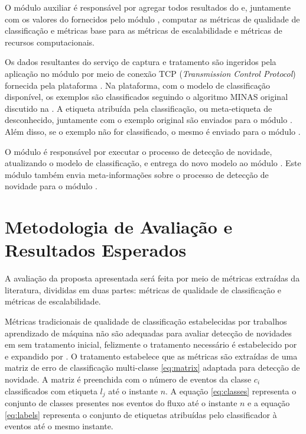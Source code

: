 O módulo auxiliar \sink é responsável por agregar todos resultados do \mfog e,
juntamente com os valores do \dataset fornecidos pelo módulo \source, computar
as métricas de qualidade de classificação e métricas base para as métricas de
escalabilidade e métricas de recursos computacionais.

Os dados resultantes do serviço de captura e tratamento são ingeridos pela
aplicação no módulo \classify por meio de conexão TCP (\emph{Transmission
Control Protocol}) fornecida pela plataforma \flink.
Na plataforma, com o modelo de classificação disponível, os exemplos são
classificados seguindo o algoritmo MINAS original discutido na .
A etiqueta atribuída pela classificação, ou meta-etiqueta de desconhecido,
juntamente com o exemplo original são enviados para o módulo \sink.
Além disso, se o exemplo não for classificado, o mesmo é enviado para o módulo
\detector.

O módulo \detector é responsável por executar o processo de detecção de
novidade, atualizando o modelo de classificação, e entrega do novo modelo
ao módulo \classify.
Este módulo também envia meta-informações sobre o processo de detecção de
novidade para o módulo \sink.

\section{Metodologia de Avaliação e Resultados Esperados}\label{sec:esperados}


A avaliação da proposta apresentada será feita por meio de métricas extraídas da
literatura, divididas em duas partes: métricas de qualidade de classificação
e métricas de escalabilidade.

Métricas tradicionais de qualidade de classificação estabelecidas por trabalhos
aprendizado de máquina não são adequadas para avaliar detecção de novidades em
\streams sem tratamento inicial, felizmente o tratamento necessário é
estabelecido por  e expandido por
.
O tratamento estabelece que as métricas são extraídas de uma matriz de erro de
classificação multi-classe \ref{eq:matrix} adaptada para detecção de novidade.
A matriz é preenchida com o número de eventos da classe $c_i$ classificados com
etiqueta $l_j$ até o instante $n$.
A equação \ref{eq:classes} representa o conjunto de classes presentes nos eventos
do fluxo até o instante $n$ e a equação \ref{eq:labels} representa o conjunto
de etiquetas atribuídas pelo classificador à eventos até o mesmo instante.

